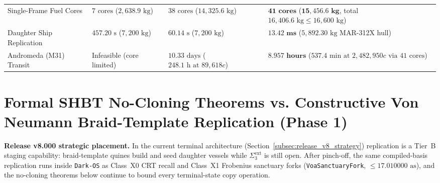 \documentclass[11pt,onecolumn]{article}
\begin{document}
\begin{table}[!htbp]
{\begin{tabular}{@{}llll@{}}
Single-Frame Fuel Cores & $7\text{ cores}$ ($2{,}638.9\text{ kg}$) & $38\text{ cores}$ ($14{,}325.6\text{ kg}$) & $\mathbf{41\text{ cores}}$ ($\mathbf{15{,}456.6\text{ kg}}$, total $16{,}406.6\text{ kg} \le 16{,}600\text{ kg}$) \\
Daughter Ship Replication & $457.20\text{ s}$ ($7{,}200\text{ kg}$) & $60.14\text{ s}$ ($7{,}200\text{ kg}$) & $\mathbf{13.42\text{ ms}}$ ($5{,}892.30\text{ kg}$ MAR-312X hull) \\
Andromeda (M31) Transit & Infeasible (core limited) & $10.33\text{ days}$ ($248.1\text{ h at } 89{,}618c$) & $\mathbf{8.957\text{ hours}}$ ($537.4\text{ min at } 2{,}482{,}950c\text{ via } 41\text{ cores}$) \\
\bottomrule
\end{tabular}%
}
\end{table}
\FloatBarrier
\section{Formal SHBT No-Cloning Theorems vs. Constructive Von Neumann Braid-Template Replication (Phase 1)}

\noindent\textbf{Release v8.000 strategic placement.} In the current terminal architecture (Section~\ref{subsec:release_v8_strategy}) replication is a Tier~B staging capability: braid-template quines build and seed daughter vessels while $\Sigma_3^{\text{ext}}$ is still open. After pinch-off, the same compiled-basis replication runs inside \texttt{Dark-OS} as Class~X0 CRT recall and Class~X1 Frobenius sanctuary forks (\texttt{VoaSanctuaryFork}, $\le17.010000\text{ as}$), and the no-cloning theorems below continue to bound every terminal-state copy operation.
\end{document}
